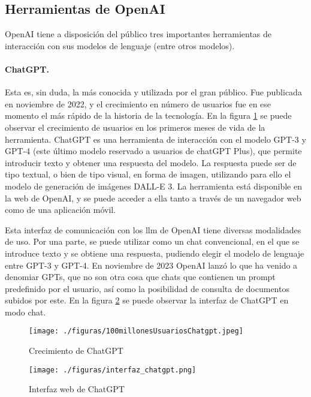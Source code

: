 \subsection{Herramientas de OpenAI}

OpenAI tiene a disposición del público tres importantes herramientas de interacción con sus modelos de lenguaje (entre otros modelos). 

    \paragraph{ChatGPT.} Esta es, sin duda, la más conocida y utilizada por el gran público. Fue publicada en noviembre de 2022, y el crecimiento en número de usuarios fue en ese momento el más rápido de la historia de la tecnología. En la figura \ref{fig:crecimiento_chatgpt} se puede observar el crecimiento de usuarios en los primeros meses de vida de la herramienta. ChatGPT es una herramienta de interacción con el modelo GPT-3 y GPT-4 (este último modelo reservado a usuarios de chatGPT Plus), que permite introducir texto y obtener una respuesta del modelo. La respuesta puede ser de tipo textual, o bien de tipo visual, en forma de imagen, utilizando para ello el modelo de generación de imágenes DALL-E 3. La herramienta está disponible en la web de OpenAI, y se puede acceder a ella tanto a través de un navegador web como de una aplicación móvil.

    Esta interfaz de comunicación con los \gls{llm} de OpenAI tiene diversas modalidades de uso. Por una parte, se puede utilizar como un chat convencional, en el que se introduce texto y se obtiene una respuesta, pudiendo elegir el modelo de lenguaje entre GPT-3 y GPT-4. En noviembre de 2023 OpenAI lanzó lo que ha venido a denomiar GPTs, que no son otra cosa que chats que contienen un prompt predefinido por el usuario, así como la posibilidad de consulta de documentos subidos por este. En la figura \ref{fig:chatgpt} se puede observar la interfaz de ChatGPT en modo chat.

    \begin{figure}[h]
        \caption[Crecimiento de ChatGPT]{Crecimiento de ChatGPT}
        \centering
        \texttt{[image: ./figuras/100millonesUsuariosChatgpt.jpeg]}
        \label{fig:crecimiento_chatgpt}
    \end{figure}

    \begin{figure}[h]
        \caption[Interfaz web de ChatGPT]{Interfaz web de ChatGPT}
        \centering
        \texttt{[image: ./figuras/interfaz\_chatgpt.png]}
        \source{\propio}
        \label{fig:chatgpt}
    \end{figure}

